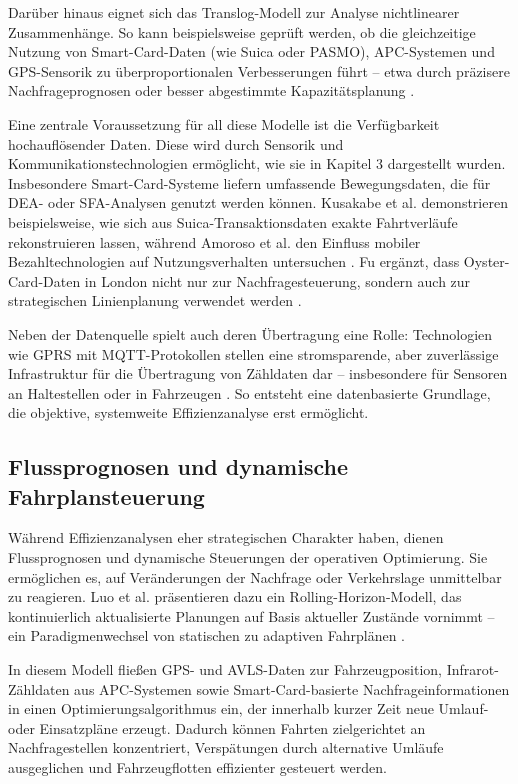 Darüber hinaus eignet sich das Translog-Modell zur Analyse nichtlinearer Zusammenhänge. So kann beispielsweise geprüft werden, ob die gleichzeitige Nutzung von Smart-Card-Daten (wie Suica oder PASMO), APC-Systemen und GPS-Sensorik zu überproportionalen Verbesserungen führt – etwa durch präzisere Nachfrageprognosen oder besser abgestimmte Kapazitätsplanung \cite{Amoroso2011, Kusakabe2010, Fu2012}.

Eine zentrale Voraussetzung für all diese Modelle ist die Verfügbarkeit hochauflösender Daten. Diese wird durch Sensorik und Kommunikationstechnologien ermöglicht, wie sie in Kapitel 3 dargestellt wurden. Insbesondere Smart-Card-Systeme liefern umfassende Bewegungsdaten, die für DEA- oder SFA-Analysen genutzt werden können. Kusakabe et al. demonstrieren beispielsweise, wie sich aus Suica-Transaktionsdaten exakte Fahrtverläufe rekonstruieren lassen, während Amoroso et al. den Einfluss mobiler Bezahltechnologien auf Nutzungsverhalten untersuchen \cite{Kusakabe2010, Amoroso2011}. Fu ergänzt, dass Oyster-Card-Daten in London nicht nur zur Nachfragesteuerung, sondern auch zur strategischen Linienplanung verwendet werden \cite{Fu2012}.

Neben der Datenquelle spielt auch deren Übertragung eine Rolle: Technologien wie GPRS mit MQTT-Protokollen stellen eine stromsparende, aber zuverlässige Infrastruktur für die Übertragung von Zähldaten dar – insbesondere für Sensoren an Haltestellen oder in Fahrzeugen \cite{SacotoCabrera2017}. So entsteht eine datenbasierte Grundlage, die objektive, systemweite Effizienzanalyse erst ermöglicht.

\subsection{Flussprognosen und dynamische Fahrplansteuerung}

Während Effizienzanalysen eher strategischen Charakter haben, dienen Flussprognosen und dynamische Steuerungen der operativen Optimierung. Sie ermöglichen es, auf Veränderungen der Nachfrage oder Verkehrslage unmittelbar zu reagieren. Luo et al. präsentieren dazu ein Rolling-Horizon-Modell, das kontinuierlich aktualisierte Planungen auf Basis aktueller Zustände vornimmt – ein Paradigmenwechsel von statischen zu adaptiven Fahrplänen \cite{Luo2019}.

In diesem Modell fließen GPS- und AVLS-Daten zur Fahrzeugposition, Infrarot-Zähldaten aus APC-Systemen \cite{Li2019} sowie Smart-Card-basierte Nachfrageinformationen in einen Optimierungsalgorithmus ein, der innerhalb kurzer Zeit neue Umlauf- oder Einsatzpläne erzeugt. Dadurch können Fahrten zielgerichtet an Nachfragestellen konzentriert, Verspätungen durch alternative Umläufe ausgeglichen und Fahrzeugflotten effizienter gesteuert werden.

